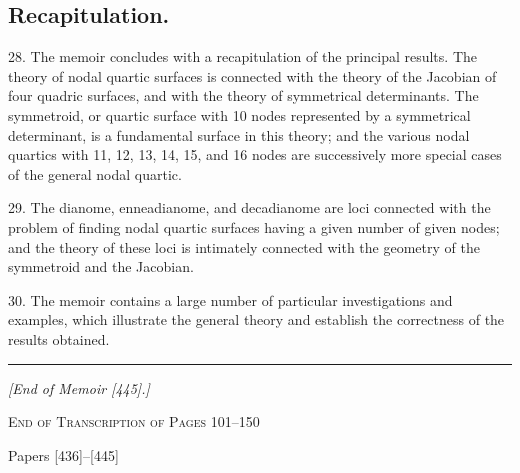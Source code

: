 \documentclass[11pt,a4paper]{article}
\begin{document}
\subsection*{Recapitulation.}

28. The memoir concludes with a recapitulation of the principal results. The theory of nodal quartic surfaces is connected with the theory of the Jacobian of four quadric surfaces, and with the theory of symmetrical determinants. The symmetroid, or quartic surface with 10 nodes represented by a symmetrical determinant, is a fundamental surface in this theory; and the various nodal quartics with 11, 12, 13, 14, 15, and 16 nodes are successively more special cases of the general nodal quartic.

29. The dianome, enneadianome, and decadianome are loci connected with the problem of finding nodal quartic surfaces having a given number of given nodes; and the theory of these loci is intimately connected with the geometry of the symmetroid and the Jacobian.

30. The memoir contains a large number of particular investigations and examples, which illustrate the general theory and establish the correctness of the results obtained.

\vspace{2em}
\noindent\rule{\textwidth}{0.4pt}
\vspace{1em}

\begin{center}
\textit{[End of Memoir [445].]}
\end{center}

\newpage

\vspace{3em}
\begin{center}
{\large\textsc{End of Transcription of Pages 101--150}}

\vspace{1em}
{\small Papers [436]--[445]}
\end{center}
\end{document}
